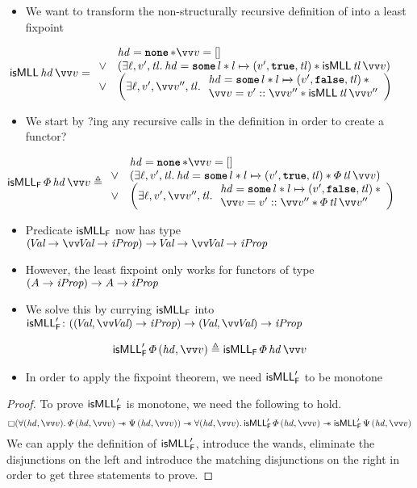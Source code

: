 \documentclass[thesis.tex]{subfiles}
\begin{document}
\begin{example}
    \label{ex:irisisMLL}
    \begin{itemize}
        \item We want to transform the non-structurally recursive definition of \isMLL into a least fixpoint
    \end{itemize}
    \begin{align*}
        \isMLL\, \hd\, \vect{\val} & = \isMLLRecDef
    \end{align*}
    \begin{itemize}
        \item We start by ?ing any recursive calls in the definition in order to create a functor?
    \end{itemize}
    \begin{align*}
        \isMLL_\hopred\, \pred\, \hd\, \vect{v} & \eqdef
        \isMLLFDef
    \end{align*}
    \begin{itemize}
        \item Predicate $\textsf{\upshape isMLL}_{\textsf{\upshape F}}$ now has type $(\Val \to \vect{\Val} \to \iProp) \to \Val \to \vect{\Val} \to \iProp$
        \item However, the least fixpoint only works for functors of type $(A \to \textit{iProp}) \to A \to \textit{iProp}$
        \item We solve this by currying $\textsf{\upshape isMLL}_{\textsf{\upshape F}}$ into $\isMLL'_\hopred\colon ((\Val, \vect{\Val}) \to \iProp) \to  (\Val, \vect{\Val}) \to \iProp$
    \end{itemize}
    \begin{align*}
        \isMLL'_\hopred\, \pred\, (\hd, \vect{\val}) \eqdef \isMLL_\hopred\, \pred\, \hd\, \vect{\val}
    \end{align*}
    \begin{itemize}
        \item In order to apply the fixpoint theorem, we need $\textsf{\upshape isMLL}'_{\textsf{\upshape F}}$ to be monotone
    \end{itemize}
    \begin{proof}
        To prove $\textsf{\upshape isMLL}'_{\textsf{\upshape F}}$ is monotone, we need the following to hold.
        \[ \always(\All(\hd, \vect{\val}). \pred\,(\hd, \vect{\val}) \wand \predB\,(\hd, \vect{\val})) \wand \All(\hd, \vect{\val}). \isMLL'_\hopred\, \pred\, (\hd, \vect{\val}) \wand \isMLL'_\hopred\, \predB\, (\hd, \vect{\val}) \]
        We can apply the definition of $\textsf{\upshape isMLL}'_{\textsf{\upshape F}}$, introduce the wands, eliminate the disjunctions on the left and introduce the matching disjunctions on the right in order to get three statements to prove.

\end{proof}
\end{example}
\end{document}
